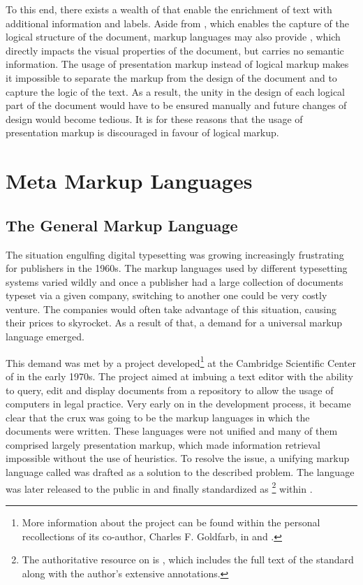 \documentclass{book}
\begin{document}
To this end, there exists a wealth of  that enable the
enrichment of text with additional information and labels. Aside from
, which enables the capture of the logical structure of the
document, markup languages may also provide , which
directly impacts the visual properties of the document, but carries no semantic
information. The usage of presentation markup instead of logical markup makes it
impossible to separate the markup from the design of the document and to capture
the logic of the text.  As a result, the unity in the design of each logical
part of the document would have to be ensured manually and future changes of
design would become tedious.  It is for these reasons that the usage of
presentation markup is discouraged in favour of logical markup.

\section{Meta Markup Languages}
\subsection{The General Markup Language}
The situation engulfing digital typesetting was growing increasingly frustrating
for publishers in the 1960s. The markup languages used by different typesetting
systems varied wildly and once a publisher had a large collection of documents
typeset via a given company, switching to another one could be very costly
venture. The companies would often take advantage of this situation, causing
their prices to skyrocket. As a result of that, a demand for a universal markup
language emerged.

This demand was met by a project developed\footnote{
  More information about the project can be found within the personal
  recollections of its co-author, Charles F. Goldfarb, in \cite{goldfarb96} and
  \cite{goldfarb97:whySGML}.
} at the Cambridge Scientific Center of  in the early 1970s. The
project aimed at imbuing a text editor with the ability to query, edit and
display documents from a repository to allow the usage of computers in legal
practice. Very early on in the development process, it became clear that the
crux was going to be the markup languages in which the documents were written.
These languages were not unified and many of them comprised largely presentation
markup, which made information retrieval impossible without the use of
heuristics. To resolve the issue, a unifying markup language called
 was drafted as a solution to the described problem. The language
was later released to the public in \cite{goldfarb81} and finally standardized
as \footnote{
  The authoritative resource on  is \cite{goldfarb91}, which
  includes the full text of the standard along with the author's extensive
  annotations.
} within \cite{iso8879}.
\end{document}
